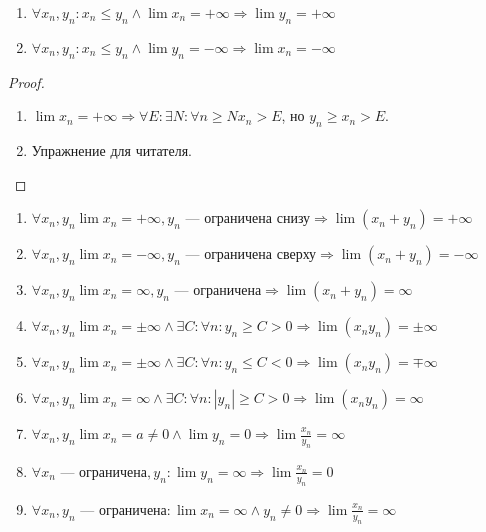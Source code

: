 \begin{theorem}
    \slashn
    \begin{enumerate}
        \item $\forall x_n, y_n: x_n \le y_n \land \lim x_n = +\infty \Rightarrow \lim y_n = +\infty$
        \item $\forall x_n, y_n: x_n \le y_n \land \lim y_n = -\infty \Rightarrow \lim x_n = -\infty$
    \end{enumerate}
\end{theorem}
\begin{proof}
    \slashn
    \begin{enumerate}
        \item $\lim x_n = +\infty \Rightarrow \forall E: \exists N : \forall n \ge N x_n > E$, но $y_n \ge x_n > E$.
        \item Упражнение для читателя.
    \end{enumerate}
\end{proof}
\begin{theorem}
    \slashn
    \begin{enumerate}
        \item $\forall x_n, y_n \lim x_n = +\infty, y_n\text{ --- ограничена снизу} \Rightarrow \lim(x_n+y_n)=+\infty$
        \item $\forall x_n, y_n \lim x_n = -\infty, y_n\text{ --- ограничена сверху} \Rightarrow \lim(x_n+y_n)=-\infty$
        \item $\forall x_n, y_n \lim x_n = \infty, y_n\text{ --- ограничена} \Rightarrow \lim(x_n+y_n)=\infty$
        \item $\forall x_n, y_n \lim x_n = \pm\infty \land \exists C: \forall n: y_n \ge C > 0  \Rightarrow \lim(x_ny_n)=\pm\infty$
        \item $\forall x_n, y_n \lim x_n = \pm\infty \land \exists C: \forall n: y_n \le C < 0  \Rightarrow \lim(x_ny_n)=\mp\infty$
        \item $\forall x_n, y_n \lim x_n = \infty \land \exists C: \forall n: |y_n| \ge C > 0  \Rightarrow \lim(x_ny_n)=\infty$
        \item $\forall x_n, y_n \lim x_n = a \neq 0 \land \lim y_n = 0  \Rightarrow \lim \frac{x_n}{y_n}=\infty$
        \item $\forall x_n\text{ --- ограничена}, y_n: \lim y_n = \infty \Rightarrow \lim \frac{x_n}{y_n} = 0$
        \item $\forall x_n, y_n\text{ --- ограничена}: \lim x_n = \infty \land y_n \neq 0 \Rightarrow \lim \frac{x_n}{y_n} = \infty$
    \end{enumerate}
\end{theorem}
